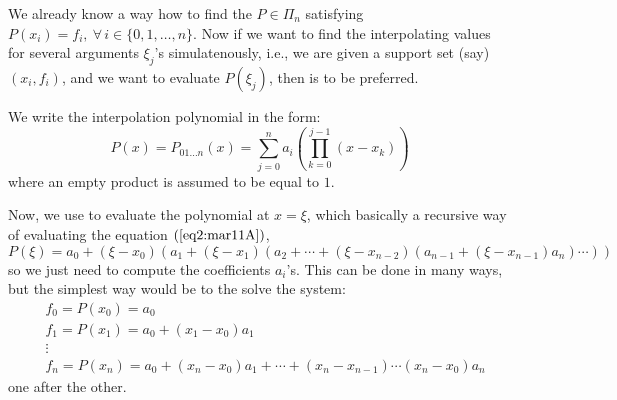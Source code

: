 We already know a way how to find the $P \in \Pi_n$ satisfying $P(x_i) = f_i, \ \forall \, i \in \{0,1,\dots,n\}$. Now
if we want to find the interpolating values for several arguments $\xi_j$'s simulatenously, i.e., we are given a support set (say) $(x_i,f_i)$, and we want to evaluate $P(\xi_j)$, then  is to be preferred.

We write the interpolation polynomial in the form:
\begin{equation}\label{eq2:mar11A}
    P(x) = P_{01\dots n}(x) = \sum_{j=0}^n a_i \left(\prod_{k=0}^{j-1} (x-x_k)\right)
\end{equation}
where an empty product is assumed to be equal to $1$. 

Now, we use  to evaluate the polynomial at $x = \xi$, which basically a recursive way of evaluating the equation $(\ref{eq2:mar11A})$,
\begin{equation}\label{eq3:mar11A}
    P(\xi) = a_0 + (\xi - x_0)\left( a_1 + (\xi - x_1)\left(  a_2 + \cdots + (\xi - x_{n-2})\left( a_{n-1} + (\xi - x_{n-1})a_n \right) \cdots \right) \right)
\end{equation}
so we just need to compute the coefficients $a_i$'s. This can be done in many ways, but the simplest way would be to the solve the system:
\begin{align*}
    &f_0 = P(x_0) = a_0 \\ 
    &f_1 = P(x_1) = a_0 + (x_1 - x_0)a_1 \\ 
    &\vdots \\
    &f_n = P(x_n) = a_0 + (x_n - x_0)a_1 +\cdots+ (x_n-x_{n-1})\cdots(x_n - x_0)a_n
\end{align*}
one after the other.